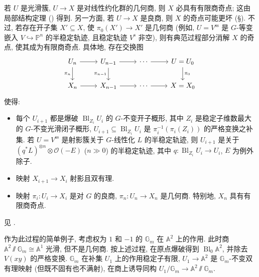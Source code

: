 \begin{example}[部分消奇]\label{src:8.5.11}
若 $U$ 是光滑簇, $U\to X$ 是对线性约化群的几何商, 则 $X$ 必具有有限商奇点; 这由局部结构定理 () 得到. 另一方面, 若 $U\to X$ 是良商, 则 $X$ 的奇点可能更坏 (\S{}). 不过, 若存在开子集 $X'\subseteq X$, 使 $\pi_0(X')\to X'$ 是几何商 (例如, $U=V^{\mathrm{ss}}$ 是 $G$-等变嵌入 $V\hookrightarrow\mathbb P^n$ 的半稳定轨迹, 且稳定轨迹 $V^{\mathrm s}$ 非空), 则有典范过程部分消解 $X$ 的奇点, 使其成为有限商奇点. 具体地, 存在交换图
\[
\begin{tikzcd}[ampersand replacement=\&]
U_n\arrow[r]\arrow[d,"\pi_n"']\&U_{n-1}\arrow[r]\arrow[d,"\pi_{n-1}"']\&\cdots\arrow[r]\&{U=U_0}\arrow[d,"\pi_0"]\\
X_n\arrow[r]\&X_{n-1}\arrow[r]\&\cdots\arrow[r]\&{X=X_0}
\end{tikzcd}
\]
使得:
\begin{itemize}
\item 每个 $U_{i+1}$ 都是爆破 $\operatorname{Bl}_{Z_i}U_i$ 的 $G$-不变开子概形, 其中 $Z_i$ 是稳定子维数最大的 $G$-不变光滑闭子概形, $U_{i+1}\subseteq\operatorname{Bl}_{Z_i}U_i$ 是 $\pi_i^{-1}(\pi_i(Z_i))$ 的严格变换之补集. 若 $U=V^{\mathrm{ss}}$ 是射影簇关于 $G$-线性化 $L$ 的半稳定轨迹, 则 $U_{i+1}$ 是关于 $(q^*L)^{\otimes n}\otimes\mathcal O(-E)$ ($n\gg0$) 的半稳定轨迹, 其中 $q:\operatorname{Bl}_{Z_i}U_i\to U_i$, $E$ 为例外除子.
\item 映射 $X_{i+1}\to X_i$ 射影且双有理.
\item 映射 $\pi_i:U_i\to X_i$ 是对 $G$ 的良商, $\pi_n:U_n\to X_n$ 是几何商. 特别地, $X_n$ 具有有限商奇点.
\end{itemize}
见 \cite{Kir85,Rei89,ER21}.

作为此过程的简单例子, 考虑权为 $1$ 和 $-1$ 的 $\mathbb G_m$ 在 $\mathbb A^2$ 上的作用. 此时商 $\mathbb A^2\sslash\mathbb G_m\cong\mathbb A^1$ 光滑, 但不是几何商. 按上述过程, 在原点爆破得到 $\operatorname{Bl}_0\mathbb A^2$, 并除去 $V(xy)$ 的严格变换. $\mathbb G_m$ 在补集 $U_1$ 上的作用稳定子有限, $U_1\to\mathbb A^2$ 是 $\mathbb G_m$-不变双有理映射 (但既不固有也不满射), 在商上诱导同构 $U_1/\mathbb G_m\to\mathbb A^2\sslash\mathbb G_m$.
\end{example}
